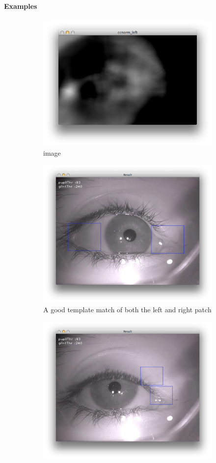 \documentclass[a4paper,11pt]{article}
\begin{document}
\paragraph{Examples}
\begin{figure}[H]
\centering
\begin{subfigure}{.32\textwidth}
  \centering
  \includegraphics[width=.8\linewidth]{templatematch}
  \caption{image}
  \label{fig:templatemathing1}
\end{subfigure}
\begin{subfigure}{.32\textwidth}
  \centering
  \includegraphics[width=.8\linewidth]{templatematched}
  \caption{A good template match of both the left and right patch}
  \label{fig:templatemathing2}
\end{subfigure}
\begin{subfigure}{.32\textwidth}
  \centering
  \includegraphics[width=.8\linewidth]{templateproblem}

\end{subfigure}
\end{figure}
\end{document}
